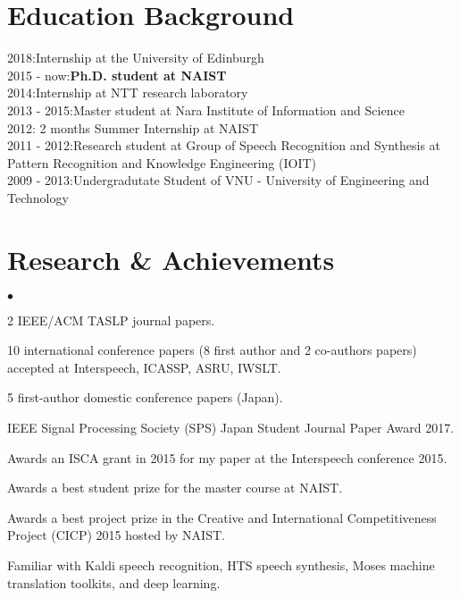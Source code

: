 \documentclass[margin,line]{res}
\newenvironment{list2}{
  \begin{list}{$\bullet$}{%
      \setlength{\itemsep}{0in}
      \setlength{\parsep}{0in} \setlength{\parskip}{0in}
      \setlength{\topsep}{0in} \setlength{\partopsep}{0in}
      \setlength{\leftmargin}{0.2in}}}{\end{list}}
\newcommand{\tab}{\hspace*{2em}}
\begin{document}
\begin{resume}
\section{\sc Education Background}
2018:\tab \tab \hspace{1.0em}Internship at the University of Edinburgh \\
2015 - now:\tab \hspace{0.3em}\textbf{Ph.D. student at NAIST} \\
2014:\tab \tab \hspace{1.1em}Internship at NTT research laboratory \\
2013 - 2015:\tab Master student at Nara Institute of Information and Science \\
2012:\tab \tab \hspace{0.7em} 2 months Summer Internship at NAIST\\
2011 - 2012:\tab Research student at Group of Speech Recognition and Synthesis at Pattern Recognition and Knowledge Engineering (IOIT)\\
2009 - 2013:\tab Undergradutate Student of VNU - University of Engineering and Technology\\
\section{\sc Research \& Achievements}
\begin{list2}
\item 2 IEEE/ACM TASLP journal papers.
\item 10 international conference papers (8 first author and 2 co-authors papers) accepted at Interspeech, ICASSP, ASRU, IWSLT.
\item 5 first-author domestic conference papers (Japan).
\item IEEE Signal Processing Society (SPS) Japan Student Journal Paper Award 2017.
\item Awards an ISCA grant in 2015 for my paper at the Interspeech conference 2015.
\item Awards a best student prize for the master course at NAIST.
\item Awards a best project prize in the Creative and International Competitiveness Project (CICP) 2015 hosted by NAIST.
\item Familiar with Kaldi speech recognition, HTS speech synthesis, Moses machine translation toolkits, and deep learning.
\end{list2}


\end{resume}
\end{document}
